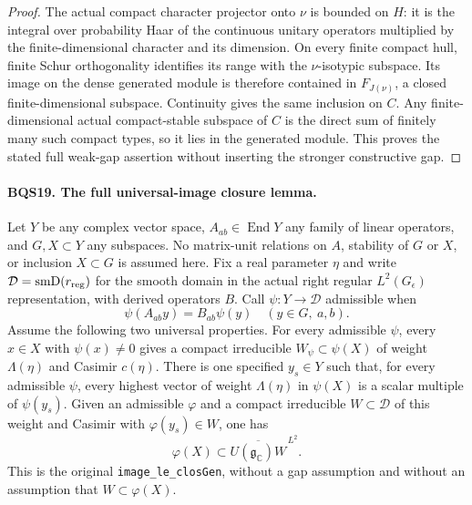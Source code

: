 \documentclass[11pt,a4paper]{article}
\numberwithin{equation}{section}
\theoremstyle{remark}\newtheorem{remark}[theorem]{Remark}
\begin{document}
\begin{proof}
The actual compact character projector onto $\nu$ is bounded on
$H$: it is the integral over probability Haar of the continuous
unitary operators multiplied by the finite-dimensional character
and its dimension.  On every finite compact hull, finite
Schur orthogonality identifies its range with the $\nu$-isotypic
subspace.  Its image on the dense generated module is therefore
contained in $F_{J(\nu)}$, a closed finite-dimensional subspace.
Continuity gives the same inclusion on $C$.
Any finite-dimensional actual compact-stable subspace of $C$ is
the direct sum of finitely many such compact types, so it lies
in the generated module.  This proves the stated full weak-gap
assertion without inserting the stronger constructive gap.
\end{proof}

\paragraph{BQS19. The full universal-image closure lemma.}
\label{claim:BQS19}
Let $Y$ be any complex vector space, $A_{ab}\in\operatorname{End}Y$
any family of linear operators, and $G,X\subset Y$ any subspaces.
No matrix-unit relations on $A$, stability of $G$ or $X$, or inclusion
$X\subset G$ is assumed here.
Fix a real parameter $\eta$ and write
$\mathcal D=\operatorname{smD}(r_{\rm reg})$ for the smooth domain
in the actual right regular $L^2(G_\epsilon)$ representation, with
derived operators $B$.
Call $\psi:Y\to\mathcal D$ admissible when
\[
               \psi(A_{ab}y)=B_{ab}\psi(y)
                            \quad(y\in G,\ a,b).
 \tag{BQS.52}
\]
Assume the following two universal properties.
For every admissible $\psi$, every $x\in X$ with $\psi(x)\ne0$
gives a compact irreducible $W_\psi\subset\psi(X)$ of weight
$\Lambda(\eta)$ and Casimir $c(\eta)$.
There is one specified $y_s\in Y$ such that, for every admissible
$\psi$, every highest vector of weight $\Lambda(\eta)$ in $\psi(X)$
is a scalar multiple of $\psi(y_s)$.
Given an admissible $\varphi$ and a compact irreducible
$W\subset\mathcal D$ of this weight and Casimir with
$\varphi(y_s)\in W$, one has
\[
       \varphi(X)\subset
       \overline{U(\mathfrak g_{\mathbb C})W}^{\,L^2}.
 \tag{BQS.53}
\]
This is the original \texttt{image\_\allowbreak le\_\allowbreak clos\allowbreak Gen}, without a gap
assumption and without an assumption that $W\subset\varphi(X)$.
\end{document}
